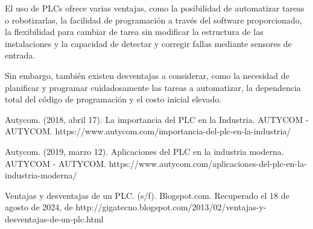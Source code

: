 \documentclass[12pt]{report}
\begin{document}
El uso de PLCs ofrece varias ventajas, como la posibilidad de automatizar tareas o robotizarlas, la facilidad de programación a través del software proporcionado, la flexibilidad para cambiar de tarea sin modificar la estructura de las instalaciones y la capacidad de detectar y corregir fallas mediante sensores de entrada.

Sin embargo, también existen desventajas a considerar, como la necesidad de planificar y programar cuidadosamente las tareas a automatizar, la dependencia total del código de programación y el costo inicial elevado.
\newpage
\begin{thebibliography}{2}
      Autycom. (2018, abril 17). La importancia del PLC en la Industria. AUTYCOM - AUTYCOM. https://www.autycom.com/importancia-del-plc-en-la-industria/

      Autycom. (2019, marzo 12). Aplicaciones del PLC en la industria moderna. AUTYCOM - AUTYCOM. https://www.autycom.com/aplicaciones-del-plc-en-la-industria-moderna/

      Ventajas y desventajas de un PLC. (s/f). Blogspot.com. Recuperado el 18 de agosto de 2024, de http://gigatecno.blogspot.com/2013/02/ventajas-y-desventajas-de-un-plc.html
\end{thebibliography}
\end{document}
